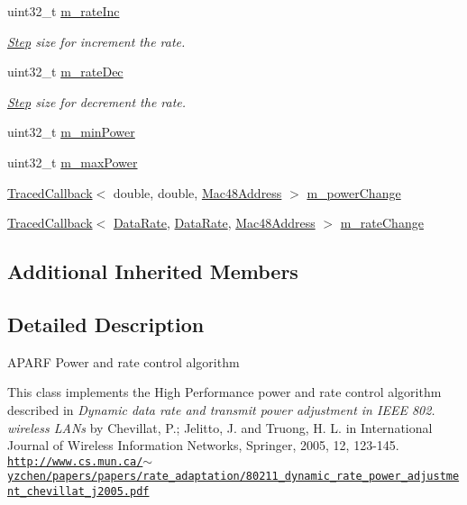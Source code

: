 \begin{DoxyCompactItemize}
uint32\+\_\+t \hyperlink{classns3_1_1AparfWifiManager_a46d7ecaf54a04e145e4be183c042a65e}{m\+\_\+rate\+Inc}
\begin{DoxyCompactList}\small\item\em \hyperlink{structStep}{Step} size for increment the rate. \end{DoxyCompactList}\item 
uint32\+\_\+t \hyperlink{classns3_1_1AparfWifiManager_a829dd14adfa5d780b324f7dca7f37362}{m\+\_\+rate\+Dec}
\begin{DoxyCompactList}\small\item\em \hyperlink{structStep}{Step} size for decrement the rate. \end{DoxyCompactList}\item 
uint32\+\_\+t \hyperlink{classns3_1_1AparfWifiManager_a4cca2208e9b2c93a96b5e1442434451b}{m\+\_\+min\+Power}
\item 
uint32\+\_\+t \hyperlink{classns3_1_1AparfWifiManager_a732bf09011390e3a9ca7f703d847215e}{m\+\_\+max\+Power}
\item 
\hyperlink{classns3_1_1TracedCallback}{Traced\+Callback}$<$ double, double, \hyperlink{classns3_1_1Mac48Address}{Mac48\+Address} $>$ \hyperlink{classns3_1_1AparfWifiManager_aa08f36618a5a666a4bf9d58f25c7efc3}{m\+\_\+power\+Change}
\item 
\hyperlink{classns3_1_1TracedCallback}{Traced\+Callback}$<$ \hyperlink{classns3_1_1DataRate}{Data\+Rate}, \hyperlink{classns3_1_1DataRate}{Data\+Rate}, \hyperlink{classns3_1_1Mac48Address}{Mac48\+Address} $>$ \hyperlink{classns3_1_1AparfWifiManager_af4fc339c43403d3dbbf6d547d5342af3}{m\+\_\+rate\+Change}
\end{DoxyCompactItemize}
\subsection*{Additional Inherited Members}


\subsection{Detailed Description}
A\+P\+A\+RF Power and rate control algorithm

This class implements the High Performance power and rate control algorithm described in {\itshape Dynamic data rate and transmit power adjustment in I\+E\+EE 802. wireless L\+A\+Ns} by Chevillat, P.; Jelitto, J. and Truong, H. L. in International Journal of Wireless Information Networks, Springer, 2005, 12, 123-\/145. \href{http://www.cs.mun.ca/~yzchen/papers/papers/rate_adaptation/80211_dynamic_rate_power_adjustment_chevillat_j2005.pdf}{\tt http\+://www.\+cs.\+mun.\+ca/$\sim$yzchen/papers/papers/rate\+\_\+adaptation/80211\+\_\+dynamic\+\_\+rate\+\_\+power\+\_\+adjustment\+\_\+chevillat\+\_\+j2005.\+pdf}

